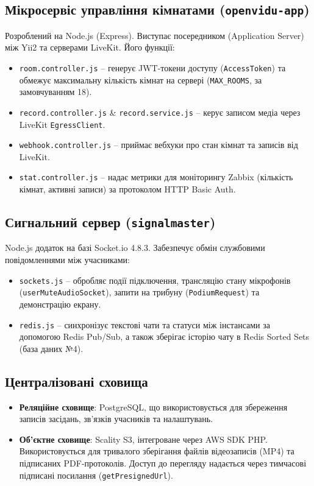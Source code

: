 \documentclass{article}
\begin{document}
\subsection{Мікросервіс управління кімнатами (\texttt{openvidu-app})}
Розроблений на Node.js (Express). Виступає посередником (Application Server) між Yii2 та серверами LiveKit. Його функції:
\begin{itemize}
    \item \texttt{room.controller.js} -- генерує JWT-токени доступу (\texttt{AccessToken}) та обмежує максимальну кількість кімнат на сервері (\texttt{MAX\_ROOMS}, за замовчуванням 18).
    \item \texttt{record.controller.js} \& \texttt{record.service.js} -- керує записом медіа через LiveKit \texttt{EgressClient}.
    \item \texttt{webhook.controller.js} -- приймає вебхуки про стан кімнат та записів від LiveKit.
    \item \texttt{stat.controller.js} -- надає метрики для моніторингу Zabbix (кількість кімнат, активні записи) за протоколом HTTP Basic Auth.
\end{itemize}

\subsection{Сигнальний сервер (\texttt{signalmaster})}
Node.js додаток на базі Socket.io 4.8.3. Забезпечує обмін службовими повідомленнями між учасниками:
\begin{itemize}
    \item \texttt{sockets.js} -- обробляє події підключення, трансляцію стану мікрофонів (\texttt{userMuteAudioSocket}), запити на трибуну (\texttt{PodiumRequest}) та демонстрацію екрану.
    \item \texttt{redis.js} -- синхронізує текстові чати та статуси між інстансами за допомогою Redis Pub/Sub, а також зберігає історію чату в Redis Sorted Sets (база даних №4).
\end{itemize}

\subsection{Централізовані сховища}
\begin{itemize}
    \item \textbf{Реляційне сховище}: PostgreSQL, що використовується для збереження записів засідань, зв'язків учасників та налаштувань.
    \item \textbf{Об'єктне сховище}: Scality S3, інтегроване через AWS SDK PHP. Використовується для тривалого зберігання файлів відеозаписів (MP4) та підписаних PDF-протоколів. Доступ до перегляду надається через тимчасові підписані посилання (\texttt{getPresignedUrl}).
\end{itemize}
\end{document}
